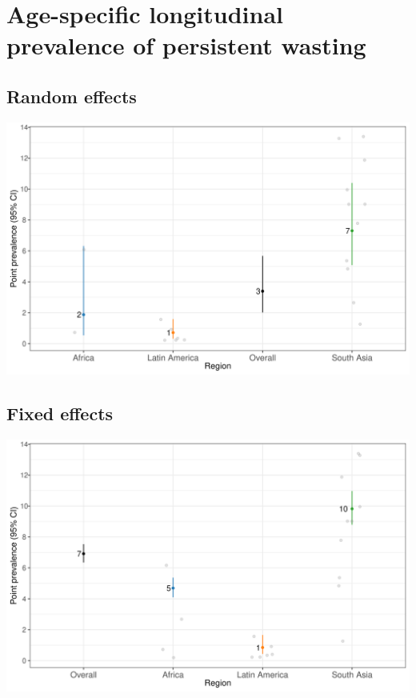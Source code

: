 \documentclass[
  9pt,
]{book}
\begin{document}
\hypertarget{age-specific-longitudinal-prevalence-of-persistent-wasting}{%
\section{Age-specific longitudinal prevalence of persistent wasting}\label{age-specific-longitudinal-prevalence-of-persistent-wasting}}

\hypertarget{random-effects-5}{%
\subsection{Random effects}\label{random-effects-5}}

\includegraphics[width=33.33in]{figures/wasting/pooled_pers024}

\hypertarget{fixed-effects-6}{%
\subsection{Fixed effects}\label{fixed-effects-6}}

\includegraphics[width=33.33in]{figures/wasting/pooled_pers024_FE}
\end{document}
